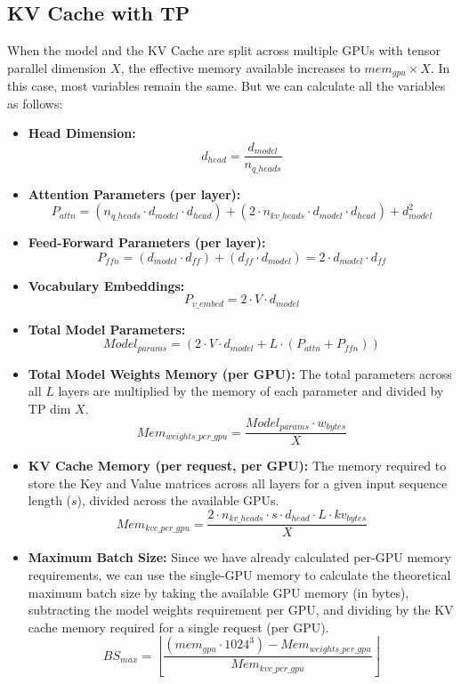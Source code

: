 \documentclass{article}
\begin{document}
\subsection{KV Cache with TP}

When the model and the KV Cache are split across multiple GPUs with tensor parallel dimension $X$, the effective memory available increases to $mem_{gpu} \times X$. In this case, most variables remain the same. But we can calculate all the variables as follows:

\begin{itemize}
    \item \textbf{Head Dimension:}
    $$d_{head} = \frac{d_{model}}{n_{q\_heads}}$$

    \item \textbf{Attention Parameters (per layer):}
    $$P_{attn} = (n_{q\_heads} \cdot d_{model} \cdot d_{head}) + (2 \cdot n_{kv\_heads} \cdot d_{model} \cdot d_{head}) + d_{model}^2$$

    \item \textbf{Feed-Forward Parameters (per layer):}
    $$P_{ffn} = (d_{model} \cdot d_{ff}) + (d_{ff} \cdot d_{model}) = 2 \cdot d_{model} \cdot d_{ff}$$

    \item \textbf{Vocabulary Embeddings:}
    $$P_{v\_embed} = 2 \cdot V \cdot d_{model}$$

    \item \textbf{Total Model Parameters:}
    $$Model_{params} = \left(2 \cdot V \cdot d_{model} + L \cdot (P_{attn} + P_{ffn})\right)$$

    \item \textbf{Total Model Weights Memory (per GPU):} The total parameters across all $L$ layers are multiplied by the memory of each parameter and divided by TP dim $X$.
    $$Mem_{weights\_per\_gpu} = \frac{Model_{params} \cdot w_{bytes}}{X}$$

    \item \textbf{KV Cache Memory (per request, per GPU):} The memory required to store the Key and Value matrices across all layers for a given input sequence length ($s$), divided across the available GPUs. 
    $$Mem_{kvc\_per\_gpu} = \frac{2 \cdot n_{kv\_heads} \cdot s \cdot d_{head} \cdot L \cdot kv_{bytes}}{X}$$

    \item \textbf{Maximum Batch Size:} Since we have already calculated per-GPU memory requirements, we can use the single-GPU memory to calculate the theoretical maximum batch size by taking the available GPU memory (in bytes), subtracting the model weights requirement per GPU, and dividing by the KV cache memory required for a single request (per GPU).
    $$BS_{max} = \left\lfloor \frac{(mem_{gpu} \cdot 1024^3) - Mem_{weights\_per\_gpu}}{Mem_{kvc\_per\_gpu}} \right\rfloor$$


\end{itemize}
\end{document}
